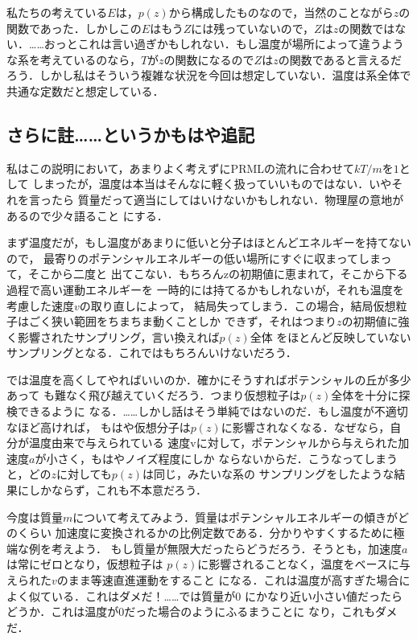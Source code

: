   私たちの考えている$E$は，$p(z)$から構成したものなので，当然のことながら$z$の関数であった．しかしこの$E$はもう$Z$には残っていないので，$Z$は$z$の関数ではない．……おっとこれは言い過ぎかもしれない．もし温度が場所によって違うような系を考えているのなら，$T$が$z$の関数になるので$Z$は$z$の関数であると言えるだろう．しかし私はそういう複雑な状況を今回は想定していない．温度は系全体で共通な定数だと想定している．

\subsection{さらに註……というかもはや追記}

  私はこの説明において，あまりよく考えずにPRMLの流れに合わせて$kT/m$を$1$として
しまったが，温度は本当はそんなに軽く扱っていいものではない．いやそれを言ったら
質量だって適当にしてはいけないかもしれない．物理屋の意地があるので少々語ること
にする．

  まず温度だが，もし温度があまりに低いと分子はほとんどエネルギーを持てないので，
最寄りのポテンシャルエネルギーの低い場所にすぐに収まってしまって，そこから二度と
出てこない．もちろんzの初期値に恵まれて，そこから下る過程で高い運動エネルギーを
一時的には持てるかもしれないが，それも温度を考慮した速度$v$の取り直しによって，
結局失ってしまう．この場合，結局仮想粒子はごく狭い範囲をちまちま動くことしか
できず，それはつまり$z$の初期値に強く影響されたサンプリング，言い換えれば$p(z)$全体
をほとんど反映していないサンプリングとなる．これではもちろんいけないだろう．

  では温度を高くしてやればいいのか．確かにそうすればポテンシャルの丘が多少あって
も難なく飛び越えていくだろう．つまり仮想粒子は$p(z)$全体を十分に探検できるように
なる．……しかし話はそう単純ではないのだ．もし温度が不適切なほど高ければ，
もはや仮想分子は$p(z)$に影響されなくなる．なぜなら，自分が温度由来で与えられている
速度vに対して，ポテンシャルから与えられた加速度$a$が小さく，もはやノイズ程度にしか
ならないからだ．こうなってしまうと，どの$z$に対しても$p(z)$は同じ，みたいな系の
サンプリングをしたような結果にしかならず，これも不本意だろう．

  今度は質量$m$について考えてみよう．質量はポテンシャルエネルギーの傾きがどのくらい
加速度に変換されるかの比例定数である．分かりやすくするために極端な例を考えよう．
もし質量が無限大だったらどうだろう．そうとも，加速度$a$は常にゼロとなり，仮想粒子は
$p(z)$に影響されることなく，温度をベースに与えられた$v$のまま等速直進運動をすること
になる．これは温度が高すぎた場合によく似ている．これはダメだ！……では質量が$0$
にかなり近い小さい値だったらどうか．これは温度が$0$だった場合のようにふるまうことに
なり，これもダメだ．

